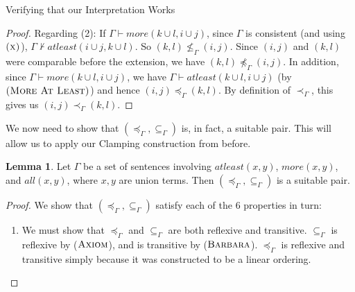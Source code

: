 \documentclass[12pt]{article}
\theoremstyle{definition}
\newtheorem{lemma}[theorem]{Lemma}
\newcommand{\provsub}{\subseteq_{\Gamma}}
\newcommand{\provle}{\le_{\Gamma}}
\newcommand{\provlt}{<_{\Gamma}}
\newcommand{\nprovle}{\nleq_{\Gamma}}
\newcommand{\provextended}{\preceq_{\Gamma}}
\newcommand{\provextendedstrict}{\prec_{\Gamma}}
\newcommand{\nprovextended}{\npreceq_{\Gamma}}
\newcommand{\proverule}{\textsc}
\begin{document}
\begin{section}{Verifying that our Interpretation Works}
\begin{proof}
Regarding (2): If $\Gamma \vdash more(k \cup l, i \cup j)$, since $\Gamma$ is consistent (and using $\proverule{(x)}$), $\Gamma \nvdash atleast(i \cup j, k \cup l)$.  So $(k,l) \nprovle (i,j)$.  
Since $(i,j)$ and $(k,l)$ were comparable before the extension, we have $(k,l) \nprovextended (i,j)$.  In addition, since $\Gamma \vdash more(k \cup l, i \cup j)$, we have $\Gamma \vdash atleast(k \cup l, i \cup j)$ (by $\proverule{(More At Least)}$) and hence $(i,j) \provextended (k,l)$.  By definition of $\provextendedstrict$, this gives us $(i,j) \provextendedstrict (k,l)$.

\end{proof}

We now need to show that $(\provextended, \provsub)$ is, in fact, a suitable pair. This will allow us to apply our Clamping construction from before.  

\begin{lemma}
    Let $\Gamma$ be a set of sentences involving $atleast(x, y)$, $more(x, y)$, and $all(x, y)$, where $x, y$ are union terms.  Then $(\provextended, \provsub)$ is a suitable pair.
    
\end{lemma}

\begin{proof}


 

We show that $(\provextended, \provsub)$ satisfy each of the 6 properties in turn:

\begin{enumerate}
    \item We must show that $\provextended$ and $\provsub$ are both reflexive and transitive.  $\provsub$ is reflexive by ($\proverule{Axiom}$), and is transitive by ($\proverule{Barbara}$).  $\provextended$ is reflexive and transitive simply because it was constructed to be a linear ordering.
    

\end{enumerate}
\end{proof}
\end{section}
\end{document}
